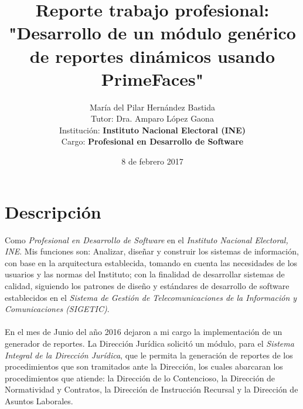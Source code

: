 \documentclass{article}
\title{Reporte trabajo profesional: \\ "Desarrollo de un módulo genérico de reportes dinámicos usando PrimeFaces"}
\author{María del Pilar Hernández Bastida\\
        Tutor: Dra. Amparo López Gaona \\
        Institución: \textbf{Instituto Nacional Electoral (INE)} \\
        Cargo: \textbf{Profesional en Desarrollo de Software}}
\date{8 de febrero 2017}
\begin{document}
\maketitle


\section{Descripción}
Como \textit{Profesional en Desarrollo de Software} en el \textit{Instituto Nacional Electoral, INE}. Mis funciones son: Analizar, diseñar y construir los sistemas de información, con base en la arquitectura establecida, tomando en cuenta las necesidades de los usuarios y las normas del Instituto; con la finalidad de desarrollar sistemas de calidad, siguiendo los patrones de diseño y estándares de desarrollo de software establecidos en el \textit{Sistema de Gestión de Telecomunicaciones de la Información y Comunicaciones (SIGETIC)}. \\ \\
En el mes de Junio del año 2016 dejaron a mi cargo la implementación de un generador de reportes. La Dirección Jurídica solicitó un módulo, para el \textit{Sistema Integral de la Dirección Jurídica}, que le permita la generación de reportes de los procedimientos que son tramitados ante la Dirección, los cuales abarcaran los procedimientos que atiende: la Dirección de lo Contencioso, la Dirección de Normatividad y Contratos, la Dirección de Instrucción Recursal y la Dirección de Asuntos Laborales.
\end{document}
